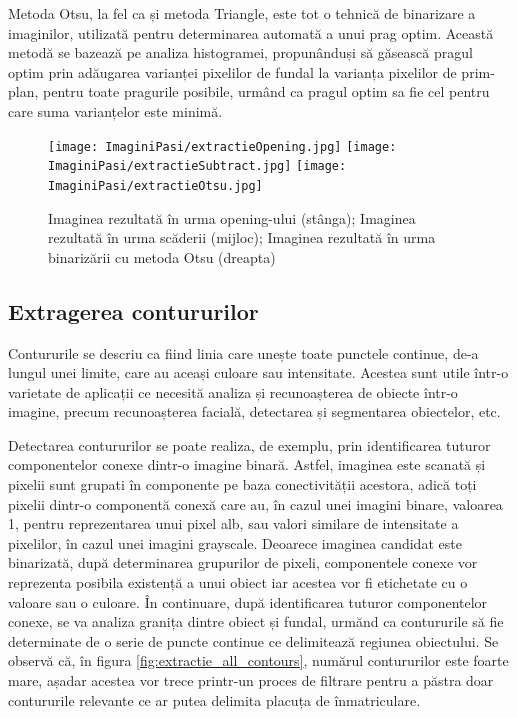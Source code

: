 \documentclass[12pt]{article}
\begin{document}
Metoda Otsu, la fel ca și metoda Triangle, este tot o tehnic\u{a} de binarizare a imaginilor, utilizat\u{a} pentru determinarea automat\u{a} a unui prag optim. Aceast\u{a} metod\u{a} se bazeaz\u{a} pe analiza histogramei, propun\^{a}nduși s\u{a} g\u{a}seasc\u{a} pragul optim prin ad\u{a}ugarea varianței pixelilor de fundal la varianța pixelilor de prim-plan, pentru toate pragurile posibile, urm\^{a}nd ca pragul optim sa fie cel pentru care suma varianțelor este minim\u{a}.

\begin{figure}[H]
  \centering
  \texttt{[image: ImaginiPasi/extractieOpening.jpg]}\hfill
  \texttt{[image: ImaginiPasi/extractieSubtract.jpg]}\hfill
    \texttt{[image: ImaginiPasi/extractieOtsu.jpg]}
  \caption{Imaginea rezultat\u{a} \^{i}n urma opening-ului (st\^{a}nga); Imaginea rezultat\u{a} \^{i}n urma sc\u{a}derii (mijloc); Imaginea rezultat\u{a} \^{i}n urma binariz\u{a}rii cu metoda Otsu (dreapta)}
  \label{fig:substract_threshold}
\end{figure}

\subsection{Extragerea contururilor}

Contururile se descriu ca fiind linia care unește toate punctele continue, de-a lungul unei limite, care au aceași culoare sau intensitate. Acestea sunt utile \^{i}ntr-o varietate de aplicații ce necesit\u{a} analiza și recunoașterea de obiecte \^{i}ntr-o imagine, precum recunoașterea facial\u{a}, detectarea și segmentarea obiectelor, etc.

Detectarea contururilor se poate realiza, de exemplu, prin identificarea tuturor componentelor conexe dintr-o imagine binar\u{a}. Astfel, imaginea este scanat\u{a} și pixelii sunt grupati \^{i}n componente pe baza conectivit\u{a}ții acestora, adic\u{a} toți pixelii dintr-o component\u{a} conex\u{a} care au, \^{i}n cazul unei imagini binare, valoarea 1, pentru reprezentarea unui pixel alb, sau valori similare de intensitate a pixelilor, \^{i}n cazul unei imagini grayscale. Deoarece imaginea candidat este binarizat\u{a}, dup\u{a} determinarea grupurilor de pixeli, componentele conexe vor reprezenta posibila existenț\u{a} a unui obiect iar acestea vor fi etichetate cu o valoare sau o culoare. \^{I}n continuare, dup\u{a} identificarea tuturor componentelor conexe, se va analiza granița dintre obiect și fundal, urm\u{a}nd ca contururile s\u{a} fie determinate de o serie de puncte continue ce delimiteaz\u{a} regiunea obiectului. Se observ\u{a} c\u{a}, \^{i}n figura \ref{fig:extractie_all_contours}, num\u{a}rul contururilor este foarte mare, așadar acestea vor trece printr-un proces de filtrare pentru a p\u{a}stra doar contururile relevante ce ar putea delimita placuța de \^{i}nmatriculare. 
\end{document}
